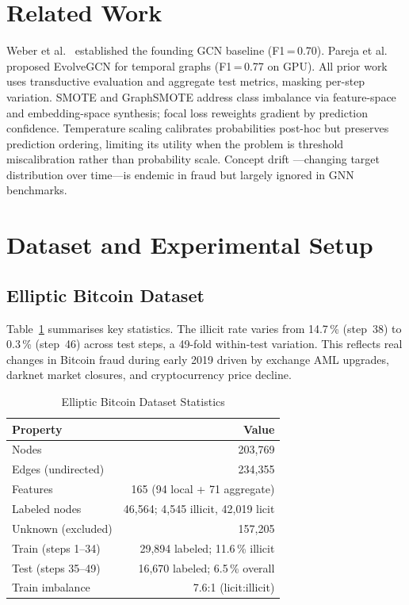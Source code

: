 \documentclass[journal,10pt,twoside]{IEEEtran}
\begin{document}
\section{Related Work}
\label{sec:related}

Weber et al.\ \cite{weber2019} established the founding GCN baseline
(F1\,=\,0.70). Pareja et al.\ \cite{pareja2020evolvegcn} proposed
EvolveGCN for temporal graphs (F1\,=\,0.77 on GPU). All prior work
uses transductive evaluation and aggregate test metrics, masking
per-step variation. SMOTE \cite{chawla2002smote} and GraphSMOTE
\cite{zhao2021graphsmote} address class imbalance via feature-space
and embedding-space synthesis; focal loss \cite{lin2017focal} reweights
gradient by prediction confidence. Temperature scaling
\cite{guo2017calibration} calibrates probabilities post-hoc but
preserves prediction ordering, limiting its utility when the problem is
threshold miscalibration rather than probability scale. Concept drift
\cite{gama2014survey}---changing target distribution over time---is
endemic in fraud but largely ignored in GNN benchmarks.

\section{Dataset and Experimental Setup}
\label{sec:dataset}

\subsection{Elliptic Bitcoin Dataset}

Table~\ref{tab:dataset} summarises key statistics. The illicit rate
varies from 14.7\,\% (step~38) to 0.3\,\% (step~46) across test steps,
a 49-fold within-test variation. This reflects real changes in Bitcoin
fraud during early 2019 driven by exchange AML upgrades, darknet market
closures, and cryptocurrency price decline.

\begin{table}[!t]
\centering
\caption{Elliptic Bitcoin Dataset Statistics}
\label{tab:dataset}
\footnotesize
\begin{tabular}{lr}
\toprule
\textbf{Property} & \textbf{Value} \\
\midrule
Nodes & 203,769 \\
Edges (undirected) & 234,355 \\
Features & 165 (94 local + 71 aggregate) \\
Labeled nodes & 46,564; 4,545 illicit, 42,019 licit \\
Unknown (excluded) & 157,205 \\
Train (steps 1--34) & 29,894 labeled; 11.6\,\% illicit \\
Test (steps 35--49) & 16,670 labeled; 6.5\,\% overall \\
Train imbalance & 7.6:1 (licit:illicit) \\
\bottomrule
\end{tabular}
\end{table}
\end{document}
